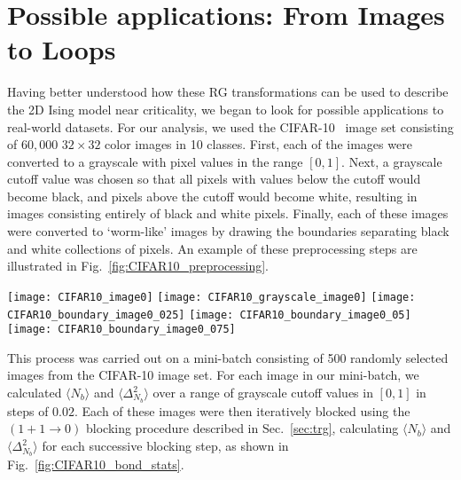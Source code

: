 \documentclass[../main.tex]{subfiles}
\begin{document}
\section{Possible applications: From Images to Loops}%
\label{sec:cifar} 
Having better understood how these RG transformations can be used to describe
the 2D Ising model near criticality, we began to look for possible applications
to real-world datasets.
%
For our analysis, we used the CIFAR-10~\cite{Krizhevsky09} image set consisting
of $60,000$ $32\times32$ color images in 10 classes.
%
First, each of the images were converted to a grayscale with pixel values in
the range $[0, 1]$.
%
Next, a grayscale cutoff value was chosen so that all pixels with values below
the cutoff would become black, and pixels above the cutoff would become white,
resulting in images consisting entirely of black and white pixels.
%
Finally, each of these images were converted to `worm-like' images by drawing
the boundaries separating black and white collections of pixels.
%
An example of these preprocessing steps are illustrated in
Fig.~\ref{fig:CIFAR10_preprocessing}.
%
\begin{figure*}[htpb]
 \centering
 \texttt{[image: CIFAR10\_image0]}
 \hspace{1.5cm}
 \texttt{[image: CIFAR10\_grayscale\_image0]}
 \texttt{[image: CIFAR10\_boundary\_image0\_025]}
 \hfill
 \texttt{[image: CIFAR10\_boundary\_image0\_05]}
 \hfill
 \texttt{[image: CIFAR10\_boundary\_image0\_075]}
 \caption{Example of preprocessing steps for converting CIFAR-10 images to
		`worm-like' images, illustrating the resulting image for different values
		of the grayscale cuttoff. (a) Original image from CIFAR-10 dataset. (b)
		Image converted to grayscale.  (c) Resulting image from cutoff values of
		$0.25$, (d) $0.5$, and (e) $0.75$.}%
\label{fig:CIFAR10_preprocessing} 
\end{figure*}
%
%
This process was carried out on a mini-batch consisting of 500 randomly
selected images from the CIFAR-10 image set.
%
For each image in our mini-batch, we calculated $\langle N_b\rangle$ and
$\langle \Delta_{N_b}^2\rangle$ over a range of grayscale cutoff values in $[0,
1]$ in steps of $0.02$.
%
Each of these images were then iteratively blocked using the $(1 + 1
\rightarrow 0)$ blocking procedure described in Sec.~\ref{sec:trg}, calculating
$\langle N_b\rangle$ and $\langle \Delta_{N_b}^2\rangle$ for each successive
blocking step, as shown in Fig.~\ref{fig:CIFAR10_bond_stats}.
\end{document}

